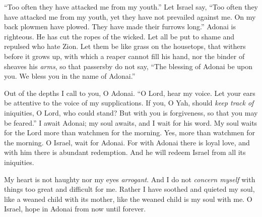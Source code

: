 \begin{biblechapter} %
 “Too often they have attacked me from my youth.” 
Let Israel say,
\verse “Too often they have attacked me from my youth, 
yet they have not prevailed against me.
\verse On my back plowmen have plowed. 
They have made their furrows long.”
\verse Adonai is righteous. 
He has cut the ropes of the wicked.
\verse Let all be put to shame and repulsed 
who hate Zion.
\verse Let them be like grass on the housetops, 
that withers before it grows up,
\verse with which a reaper cannot fill his hand, 
nor the binder of sheaves his \textit{arms},
\verse so that passersby do not say, 
“The blessing of Adonai be upon you. 
We bless you in the name of Adonai.”
\end{biblechapter}

\begin{biblechapter} %
 Out of the depths I call to you, O Adonai.
\verse “O Lord, hear my voice. 
Let your ears be attentive 
to the voice of my supplications.
\verse If you, O Yah, should \textit{keep track of} iniquities, 
O Lord, who could stand?
\verse But with you is forgiveness, 
so that you may be feared.”
\verse I await Adonai; my soul awaits, 
and I wait for his word.
\verse My soul waits for the Lord 
more than watchmen for the morning. 
Yes, more than watchmen for the morning.
\verse O Israel, wait for Adonai. 
For with Adonai there is loyal love, 
and with him there is abundant redemption.
\verse And he will redeem Israel 
from all its iniquities.
\end{biblechapter}

\begin{biblechapter} %
 My heart is not haughty nor my eyes \textit{arrogant}. 
And I do not \textit{concern myself} 
with things too great and difficult for me.
\verse Rather I have soothed and quieted my soul, 
like a weaned child with its mother, 
like the weaned child is my soul with me.
\verse O Israel, hope in Adonai 
from now until forever.
\end{biblechapter}

